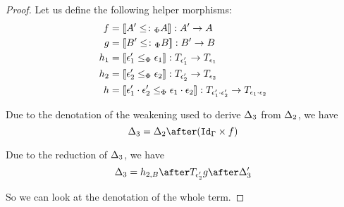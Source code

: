 \documentclass{Report}
\begin{document}
\begin{proof}
    Let us define the following helper morphisms:
    \begin{align*}
        f & = \deno{A' \subtypep A}: A' \rightarrow A\\
        g & = \deno{B' \subtypep B}: B' \rightarrow B\\
        h_1 & = \deno{\e_1' \subeffectp \e_1} : \T{\e_1'}{} \rightarrow \T{\e_1}{} \\
        h_2 & = \deno{\e_2'\subeffectp \e_2}:\T{\e_2'}{} \rightarrow \T{\e_2}{}\\
        h & = \deno{\e_1'\dot\e_2'\subeffectp\e_1\dot\e_2}: \T{\e_1'\dot\e_2'}{}\rightarrow \T{\e_1\dot\e_2}{}
    \end{align*}

    Due to the denotation of the weakening used to derive $\Delta_3$ from $\Delta_2$, we have 
    \begin{equation}
        \D_3 = \D_2\after(\idg\times f)
    \end{equation}

    Due to the reduction of $\Delta_3$,
    we have 
    \begin{equation}
        \D_3 = h_{2, B} \after \T{\e_2'}{g}\after \D_3'
    \end{equation}

    So we can look at the denotation of the whole term.


\end{proof}
\end{document}
